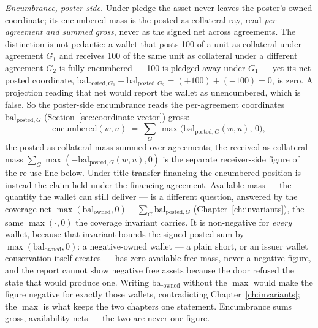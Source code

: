 \emph{Encumbrance, poster side.} Under pledge the asset never leaves the
poster's owned coordinate; its encumbered mass is the posted-as-collateral ray,
read \emph{per agreement and summed gross}, never as the signed net across
agreements. The distinction is not pedantic: a wallet that posts 100 of a unit as
collateral under agreement $G_1$ and receives 100 of the same unit as collateral
under a different agreement $G_2$ is fully encumbered --- 100 is pledged away under
$G_1$ --- yet its net posted coordinate,
$\mathrm{bal}_{\text{posted},G_1}+\mathrm{bal}_{\text{posted},G_2}=(+100)+(-100)=0$,
is zero. A projection reading that net would report the wallet as unencumbered,
which is false. So the poster-side encumbrance reads the per-agreement coordinates
$\mathrm{bal}_{\text{posted},G}$ (Section~\ref{sec:coordinate-vector})
gross:
\[
\text{encumbered}(w,u)\ =\ \sum_{G}\ \max\bigl(\mathrm{bal}_{\text{posted},G}(w,u),\,0\bigr),
\]
the posted-as-collateral mass summed over agreements; the received-as-collateral
mass $\sum_{G}\max(-\mathrm{bal}_{\text{posted},G}(w,u),0)$ is the separate
receiver-side figure of the re-use line below. Under title-transfer financing the
encumbered position is instead the claim held under the financing agreement.
Available mass --- the quantity the wallet can still deliver --- is a different
question, answered by the coverage net $\max(\mathrm{bal}_{\text{owned}},0)-\sum_G
\mathrm{bal}_{\text{posted},G}$ (Chapter~\ref{ch:invariants}), the same
$\max(\cdot,0)$ the coverage invariant carries. It is non-negative for
\emph{every} wallet, because that invariant bounds the signed posted sum by
$\max(\mathrm{bal}_{\text{owned}},0)$: a negative-owned wallet --- a plain short,
or an issuer wallet conservation itself creates --- has zero available free mass,
never a negative figure, and the report cannot show negative free assets because
the door refused the state that would produce one. Writing $\mathrm{bal}_{\text{owned}}$
without the $\max$ would make the figure negative for exactly those wallets, contradicting
Chapter~\ref{ch:invariants}; the $\max$ is what keeps the two chapters one statement.
Encumbrance sums gross, availability nets --- the two are never one figure.


